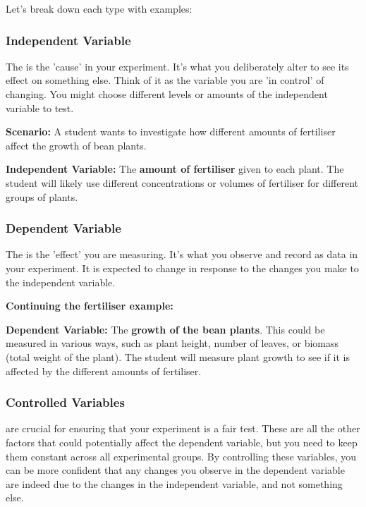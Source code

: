 Let's break down each type with examples:

\subsubsection{Independent Variable}

The  is the 'cause' in your experiment. It's what you deliberately alter to see its effect on something else.  Think of it as the variable you are 'in control' of changing.  You might choose different levels or amounts of the independent variable to test.

\begin{example}
\textbf{Scenario:} A student wants to investigate how different amounts of fertiliser affect the growth of bean plants.

\textbf{Independent Variable:} The \textbf{amount of fertiliser} given to each plant.  The student will likely use different concentrations or volumes of fertiliser for different groups of plants.
\end{example}

\subsubsection{Dependent Variable}

The  is the 'effect' you are measuring. It's what you observe and record as data in your experiment.  It is expected to change in response to the changes you make to the independent variable.

\begin{example}
\textbf{Continuing the fertiliser example:}

\textbf{Dependent Variable:} The \textbf{growth of the bean plants}. This could be measured in various ways, such as plant height, number of leaves, or biomass (total weight of the plant).  The student will measure plant growth to see if it is affected by the different amounts of fertiliser.
\end{example}

\subsubsection{Controlled Variables}

 are crucial for ensuring that your experiment is a fair test.  These are all the other factors that could potentially affect the dependent variable, but you need to keep them constant across all experimental groups.  By controlling these variables, you can be more confident that any changes you observe in the dependent variable are indeed due to the changes in the independent variable, and not something else.

